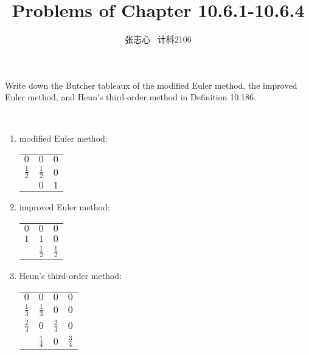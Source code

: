 \documentclass[lang=cn,a4paper,newtx,bibend=bibtex]{elegantpaper}
\title{Problems of Chapter 10.6.1-10.6.4}
\author{张志心 \ 计科2106}
\date{\zhdate{2024/05/06}}
\begin{document}
\maketitle

\begin{prob}[Exercise 10.179]
  Write down the Butcher tableaux of the modified Euler method,
  the improved Euler method, and Heun's third-order method in Definition 10.186.
\end{prob}

\begin{solution}~~\\
\begin{enumerate}[(1)]
  \item modified Euler method:
    \begin{table*}[h!]
      \begin{center}
        \begin{tabular}{c|cc}
          $0$ & $0$ & $0$ \\
          $\frac 12$ & $\frac 12$ & $0$ \\
          \hline
          & $0$ & $1$ \\
        \end{tabular}
      \end{center}
    \end{table*}
  \item improved Euler method:
    \begin{table*}[h!]
      \begin{center}
        \begin{tabular}{c|cc}
          $0$ & $0$ & $0$ \\
          $1$ & $1$ & $0$ \\
          \hline
          & $\frac 12$ & $\frac 12$ \\
        \end{tabular}
      \end{center}
    \end{table*}
  \item Heun's third-order method:
    \begin{table*}[h!]
      \begin{center}
        \begin{tabular}{c|ccc}
          $0$ & $0$ & $0$ & $0$ \\
          $\frac 13$ & $\frac 13$ & $0$ & $0$ \\
          $\frac 23$ & $0$ & $\frac 23$ & $0$ \\
          \hline
          & $\frac 14$ & $0$ & $\frac 34$ \\
        \end{tabular}
      \end{center}
    \end{table*}
\end{enumerate}
\end{solution}
\end{document}

